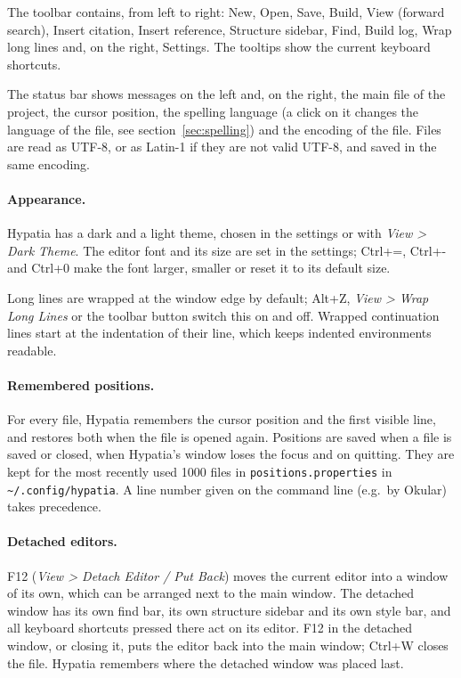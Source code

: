 \documentclass[11pt]{article}
\newcommand{\key}[1]{\textsf{#1}}
\newcommand{\menu}[1]{\textsf{\textit{#1}}}
\newcommand{\file}[1]{\texttt{#1}}
\newcommand{\cfgdir}{\texttt{\textasciitilde/.config/hypatia}}
\begin{document}
    The toolbar contains, from left to right: New, Open, Save, Build, View (forward search), Insert citation, Insert reference, Structure sidebar, Find, Build log, Wrap long lines and, on the right, Settings. The tooltips show the current keyboard shortcuts.

    The status bar shows messages on the left and, on the right, the main file of the project, the cursor position, the spelling language (a click on it changes the language of the file, see section~\ref{sec:spelling}) and the encoding of the file. Files are read as UTF-8, or as Latin-1 if they are not valid UTF-8, and saved in the same encoding.

    \paragraph{Appearance.} Hypatia has a dark and a light theme, chosen in the settings or with \menu{View > Dark Theme}. The editor font and its size are set in the settings; \key{Ctrl+=}, \key{Ctrl+-} and \key{Ctrl+0} make the font larger, smaller or reset it to its default size.

    Long lines are wrapped at the window edge by default; \key{Alt+Z}, \menu{View > Wrap Long Lines} or the toolbar button switch this on and off. Wrapped continuation lines start at the indentation of their line, which keeps indented environments readable.

    \paragraph{Remembered positions.} For every file, Hypatia remembers the cursor position and the first visible line, and restores both when the file is opened again. Positions are saved when a file is saved or closed, when Hypatia's window loses the focus and on quitting. They are kept for the most recently used 1000 files in \file{positions.properties} in \cfgdir. A line number given on the command line (e.g.\ by Okular) takes precedence.

    \paragraph{Detached editors.} \key{F12} (\menu{View > Detach Editor / Put Back}) moves the current editor into a window of its own, which can be arranged next to the main window. The detached window has its own find bar, its own structure sidebar and its own style bar, and all keyboard shortcuts pressed there act on its editor. \key{F12} in the detached window, or closing it, puts the editor back into the main window; \key{Ctrl+W} closes the file. Hypatia remembers where the detached window was placed last.
\end{document}
